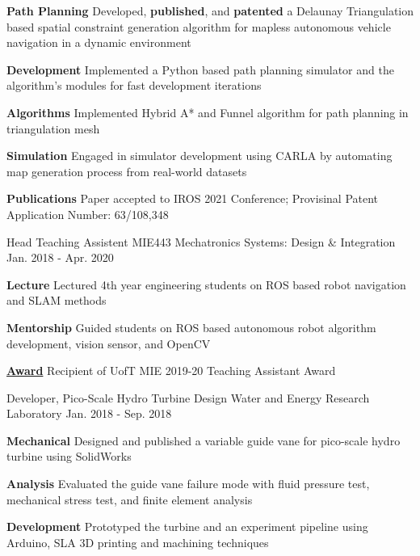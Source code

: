 \begin{cventries}
	{
		\begin{cvitems}
			\item {
				\textbf{Path Planning} Developed, \textbf{published}, and \textbf{patented} a Delaunay Triangulation based spatial constraint generation algorithm for mapless autonomous vehicle navigation in a dynamic environment
			}
			\item {
				\textbf{Development} Implemented a Python based path planning simulator and the algorithm's modules for fast development iterations
			}
			\item {
				\textbf{Algorithms} Implemented Hybrid A* and Funnel algorithm for path planning in triangulation mesh
			}
			\item {
				\textbf{Simulation} Engaged in simulator development using CARLA by automating map generation process from real-world datasets
			}
			\item{
				\textbf{Publications} Paper accepted to IROS 2021 Conference; Provisinal Patent Application Number: 63/108,348
			}
		\end{cvitems}
	}
	\cventry
	{Head Teaching Assistent}
	{MIE443 Mechatronics Systems: Design \& Integration}
	{Jan. 2018 - Apr. 2020}
	{}
	{
		\begin{cvitems}
			\item {
				\textbf{Lecture} Lectured 4th year engineering students on ROS based robot navigation and SLAM methods
			}
			\item {
				\textbf{Mentorship} Guided students on ROS based autonomous robot algorithm development, vision sensor, and OpenCV
			}
			\item \textbf{\href{https://www.mie.utoronto.ca/congratulations-2019-20-teaching-assistant-award-winners-lap-tak-chu-richard-hu-behzad-khamidehi-ben-leung-and-khalil-sidawi/}{Award}} Recipient of UofT MIE 2019-20 Teaching Assistant Award
		\end{cvitems}
	}
	\cventry
	{Developer, Pico-Scale Hydro Turbine Design}
	{Water and Energy Research Laboratory}
	{Jan. 2018 - Sep. 2018}
	{}
	{
		\begin{cvitems}
			\item {\textbf{Mechanical} Designed and published a variable guide vane for pico-scale hydro turbine using SolidWorks}
			\item {\textbf{Analysis} Evaluated the guide vane failure mode with fluid pressure test, mechanical stress test, and finite element analysis}
			\item {\textbf{Development} Prototyped the turbine and an experiment pipeline using Arduino, SLA 3D printing and machining techniques}

\end{cvitems}}
\end{cventries}
